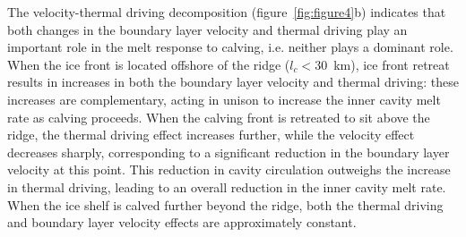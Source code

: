 \documentclass[draft]{agujournal2019}
\begin{document}
The velocity-thermal driving decomposition (figure~\ref{fig:figure4}b) indicates that both changes in the boundary layer velocity and thermal driving play an important role in the melt response to calving, i.e. neither plays a dominant role.  When the ice front is located offshore of the ridge ($l_c < 30$~km), ice front retreat results in increases in both the boundary layer velocity and thermal driving: these increases are complementary, acting in unison to increase the inner cavity melt rate as calving proceeds. When the calving front is retreated to sit above the ridge, the thermal driving effect increases further, while the velocity effect decreases sharply, corresponding to a significant reduction in the boundary layer velocity at this point. This reduction in cavity circulation outweighs the increase in thermal driving, leading to an overall reduction in the inner cavity melt rate. When the ice shelf is calved further beyond the ridge, both the thermal driving and boundary layer velocity effects are approximately constant.
\end{document}
